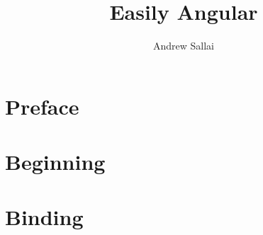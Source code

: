 \documentclass[12pt]{report}
\title{Easily Angular}
\author{Andrew Sallai}
\begin{document}
 
\maketitle
\tableofcontents
\newpage
 
 
\chapter{Preface}

 
\chapter{Beginning}

 
\chapter{Binding}

 
\end{document}
